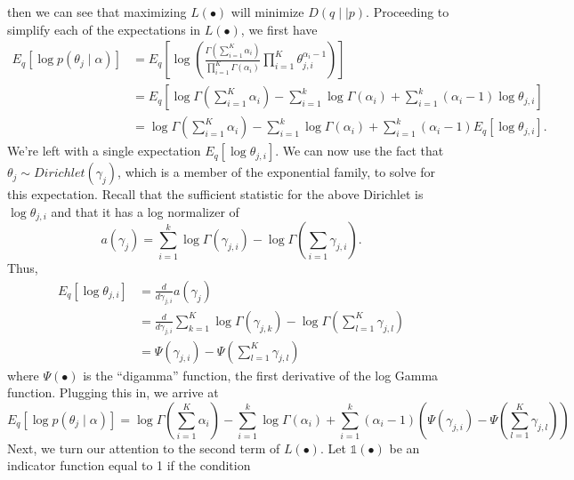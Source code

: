 \documentclass[11pt]{article}
\begin{document}
then we can see that maximizing $L(\bullet)$ will minimize $D(q\mid\mid
p)$. Proceeding to simplify each of the expectations in $L(\bullet)$, we
first have
\begin{align}
  E_q\left[\log p(\theta_j \mid \alpha)\right]
  &=
  E_q\left[
    \log \left(
      \frac{\Gamma(\sum_{i=1}^K \alpha_i)}
      {\prod_{i=1}^K \Gamma(\alpha_i)}
      \prod_{i=1}^K \theta_{j,i}^{\alpha_i - 1}
    \right)
  \right]
  \\&=
  E_q\left[
    \log \Gamma\left(\sum_{i=1}^K \alpha_i\right)
    - \sum_{i=1}^k \log \Gamma(\alpha_i)
    + \sum_{i=1}^k (\alpha_i - 1)\log \theta_{j,i}
  \right]
  \\&=
  \log \Gamma\left(\sum_{i=1}^K \alpha_i\right)
  - \sum_{i=1}^k \log \Gamma(\alpha_i)
  + \sum_{i=1}^k (\alpha_i - 1)E_q\left[\log \theta_{j,i}\right].
\end{align}
We're left with a single expectation $E_q[\log \theta_{j,i}]$. We can now
use the fact that $\theta_j \sim Dirichlet(\gamma_j)$, which is a member of
the exponential family, to solve for this expectation. Recall that the
sufficient statistic for the above Dirichlet is $\log \theta_{j,i}$ and
that it has a log normalizer of
\begin{equation}
  a(\gamma_j) = \sum_{i=1}^k \log
  \Gamma(\gamma_{j,i}) - \log \Gamma\left(\sum_{i=1} \gamma_{j,i}\right).
\end{equation}
Thus,
\begin{align}
  \label{eqn:digamma-beg}
  E_q\left[\log \theta_{j,i}\right]
  &=
  \frac{d}{d\gamma_{j,i}} a(\gamma_j)
  \\&=
  \frac{d}{d\gamma_{j,i}} \sum_{k=1}^K \log \Gamma(\gamma_{j,k})
  - \log \Gamma\left(\sum_{l=1}^K \gamma_{j,l}\right)
  \\&=
  \Psi(\gamma_{j,i}) - \Psi\left(\sum_{l=1}^K \gamma_{j,l}\right)
  \label{eqn:digamma-end}
\end{align}
where $\Psi(\bullet)$ is the ``digamma'' function, the first derivative of
the log Gamma function. Plugging this in, we arrive at
\begin{equation}
  E_q\left[\log p(\theta_j \mid \alpha)\right]
  =
  \log \Gamma\left(\sum_{i=1}^K \alpha_i\right)
  - \sum_{i=1}^k \log \Gamma(\alpha_i)
  + \sum_{i=1}^k (\alpha_i - 1)
  \left(\Psi(\gamma_{j,i}) - \Psi\left(\sum_{l=1}^K \gamma_{j,l}\right)\right)
\end{equation}
Next, we turn our attention to the second term of $L(\bullet)$. Let
$\mathbb{1}(\bullet)$ be an indicator function equal to 1 if the condition
\end{document}
